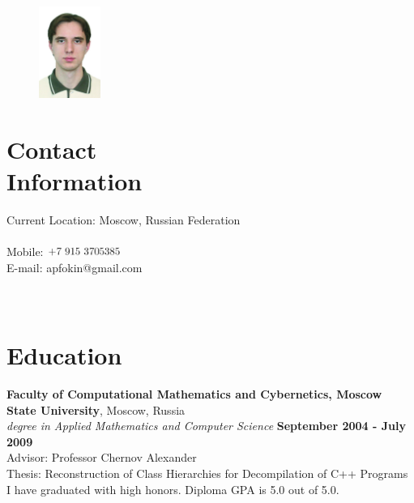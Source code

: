 \documentclass[margin,line]{CV}
\begin{document}
\begin{resume}

\begin{figure}
    \vspace{-20pt}
    \includegraphics[width=2cm]{photo.jpg}
    \vspace{-20pt}
\end{figure}

    \section{\mysidestyle Contact\\Information}
    Current Location: Moscow, Russian Federation \\
    \\
    Mobile: \includegraphics[height=0.35cm]{phone.png} \\ 
    E-mail: apfokin@gmail.com \\
    \\
    \\


    \section{\mysidestyle Education}
    \textbf{Faculty of Computational Mathematics and Cybernetics, Moscow State University}, Moscow, Russia \vspace{2mm}\\\vspace{1mm}%
    \textsl{ degree in Applied Mathematics and Computer Science} \hfill \textbf{September 2004 - July 2009}\vspace{1mm}\\
    Advisor: Professor Chernov Alexander \\
    Thesis: Reconstruction of Class Hierarchies for Decompilation of C++ Programs \\
    I have graduated with high honors. Diploma GPA is 5.0 out of 5.0.


\end{resume}
\end{document}
